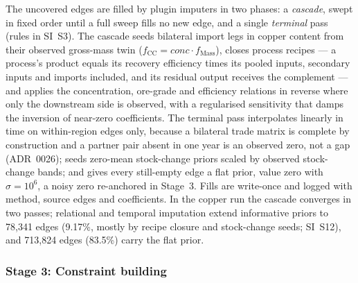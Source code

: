 The uncovered edges are filled by plugin imputers in two phases: a
\emph{cascade}, swept in fixed order until a full sweep fills no new edge,
and a single \emph{terminal} pass (rules in SI~S3). The cascade seeds
bilateral import legs in copper content from their observed gross-mass twin
($f_{\mathrm{CC}} = \mathit{conc} \cdot f_{\mathrm{Mass}}$), closes
process recipes --- a process's product equals its recovery efficiency times
its pooled inputs, secondary inputs and imports included, and its residual
output receives the complement --- and applies the concentration, ore-grade
and efficiency relations in reverse where only the downstream side is
observed, with a regularised sensitivity that damps the inversion of
near-zero coefficients. The terminal pass interpolates linearly in time on
within-region edges only, because a bilateral trade matrix is complete by
construction and a partner pair absent in one year is an observed zero, not
a gap (ADR~0026); seeds zero-mean stock-change priors scaled by observed
stock-change bands; and gives every still-empty edge a flat prior, value
zero with $\sigma = 10^{6}$, a noisy zero re-anchored in Stage~3. Fills are
write-once and logged with method, source edges and coefficients. In the
copper run the cascade converges in two passes; relational and temporal
imputation extend informative priors to 78{,}341 edges (9.17\%, mostly by
recipe closure and stock-change seeds; SI~S12), and 713{,}824 edges
(83.5\%) carry the flat prior.

\subsubsection{Stage 3: Constraint building}\label{sec:stage3}

